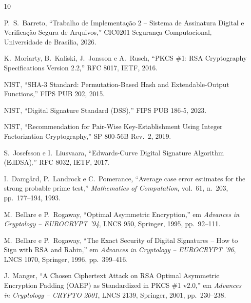 \documentclass[conference]{IEEEtran}
\begin{document}
\begin{thebibliography}{10}

P.~S.~Barreto, ``Trabalho de Implementação 2 -- Sistema de Assinatura Digital e Verificação Segura de Arquivos,'' CIC0201 Segurança Computacional, Universidade de Brasília, 2026.

K.~Moriarty, B.~Kaliski, J.~Jonsson e A.~Rusch, ``PKCS \#1: RSA Cryptography Specifications Version 2.2,'' RFC 8017, IETF, 2016.

NIST, ``SHA-3 Standard: Permutation-Based Hash and Extendable-Output Functions,'' FIPS PUB 202, 2015.

NIST, ``Digital Signature Standard (DSS),'' FIPS PUB 186-5, 2023.

NIST, ``Recommendation for Pair-Wise Key-Establishment Using Integer Factorization Cryptography,'' SP 800-56B Rev.~2, 2019.

S.~Josefsson e I.~Liusvaara, ``Edwards-Curve Digital Signature Algorithm (EdDSA),'' RFC 8032, IETF, 2017.

I.~Damgård, P.~Landrock e C.~Pomerance, ``Average case error estimates for the strong probable prime test,'' \textit{Mathematics of Computation}, vol.~61, n.~203, pp.~177--194, 1993.

M.~Bellare e P.~Rogaway, ``Optimal Asymmetric Encryption,'' em \textit{Advances in Cryptology -- EUROCRYPT '94}, LNCS 950, Springer, 1995, pp.~92--111.

M.~Bellare e P.~Rogaway, ``The Exact Security of Digital Signatures -- How to Sign with RSA and Rabin,'' em \textit{Advances in Cryptology -- EUROCRYPT '96}, LNCS 1070, Springer, 1996, pp.~399--416.

J.~Manger, ``A Chosen Ciphertext Attack on RSA Optimal Asymmetric Encryption Padding (OAEP) as Standardized in PKCS \#1 v2.0,'' em \textit{Advances in Cryptology -- CRYPTO 2001}, LNCS 2139, Springer, 2001, pp.~230--238.

\end{thebibliography}
\end{document}

